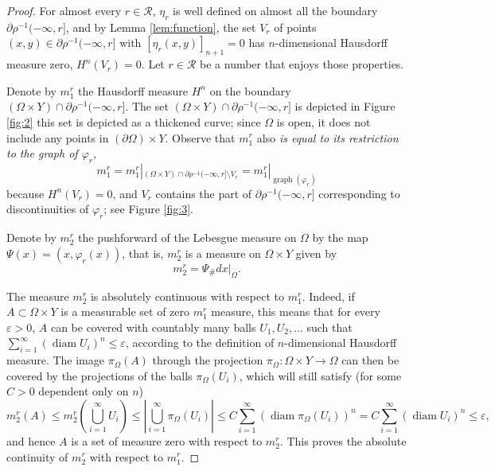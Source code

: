 \documentclass{article}
\theoremstyle{definition}
\theoremstyle{remark}
\newcommand{\proj}{\pi}
\newcommand{\projX}{\proj_{\Omega}}
\begin{document}
 \begin{proof}
 For almost every $r\in {\mathcal R}$, $\eta_r$ is well defined on almost all the boundary $\partial\rho^{-1}(-\infty,r]$, and by Lemma \ref{lem:function}, the set $V_r$ of points $(x,y)\in\partial\rho^{-1}(-\infty,r]$ with $[\eta_r(x,y)]_{n+1}=0$ has $n$-dimensional Hausdorff measure zero, $H^n(V_r)=0$. Let $r\in {\mathcal R}$ be a number that enjoys those properties.
 
 Denote by $m_1^r$ the Hausdorff measure $H^n$ on the boundary $(\Omega\times Y)\cap\partial \rho^{-1}(-\infty,r]$. The set $(\Omega\times Y)\cap\partial \rho^{-1}(-\infty,r]$ is depicted in Figure \ref{fig:2} this set is depicted as a thickened curve; since $\Omega$ is open, it does not include any points in $(\partial\Omega)\times Y$.
 Observe that $m_1^r$ also \emph{is equal to its restriction to the graph of $\varphi_r$,}
 \begin{equation}\label{eq:restriction}
  m^r_1=m^r_1|_{(\Omega\times Y)\cap\partial \rho^{-1}(-\infty,r]\setminus V_r}=m^r_1|_{\operatorname{graph}(\varphi_r)}
 \end{equation}
 because $H^n(V_r)=0$, and $V_r$ contains the part of $\partial\rho^{-1}(-\infty,r]$ corresponding to discontinuities of $\varphi_r$; see Figure \ref{fig:3}. 
 
 Denote by $m_2^r$ the pushforward of 
{the} Lebesgue measure on $\Omega$ by the map $\Psi(x)=(x,\varphi_r(x))$, that is, $m_2^r$ is a measure on $\Omega \times Y$ given by
 \[m_2^r=\Psi_{\#}dx|_{\Omega}.\] 
 
 The measure $m_2^r$ is absolutely continuous with respect to $m_1^r$. Indeed, if $A\subset\Omega\times Y$ is a measurable set of zero $m_1^r$ measure, this means that for every $\varepsilon>0$, $A$ can be covered with countably many balls $U_1,U_2,\dots$ such that $\sum_{i=1}^\infty(\operatorname{diam} U_i)^n\leq \varepsilon$, according to the definition of $n$-dimensional Hausdorff measure. The image $\projX{}(A)$ through the projection $\projX{}\colon\Omega\times Y\to\Omega$ can then be covered by the projections of the balls $\projX{}(U_i)$, which will still satisfy (for some $C>0$ dependent only on $n$)
 \[m^r_2(A)\leq m^r_2({\textstyle\bigcup_{i=1}^\infty U_i})\leq |\textstyle\bigcup_{i=1}^\infty \projX{}(U_i)|\leq C\sum_{i=1}^\infty(\operatorname{diam}\projX{}(U_i))^n=C\sum_{i=1}^\infty(\operatorname{diam}U_i)^n\leq \varepsilon,\] 
 and hence $A$ is a set of measure zero with respect to $m_2^r$. This proves the absolute continuity of $m_2^r$ with respect to $m_1^r$.
 

\end{proof}
\end{document}
